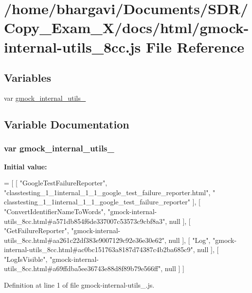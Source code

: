 \hypertarget{gmock-internal-utils__8cc_8js}{}\section{/home/bhargavi/\+Documents/\+S\+D\+R/\+Copy\+\_\+\+Exam\+\_\+X/docs/html/gmock-\/internal-\/utils\+\_\+8cc.js File Reference}
\label{gmock-internal-utils__8cc_8js}
\subsection*{Variables}
\begin{DoxyCompactItemize}
\item 
var \hyperlink{gmock-internal-utils__8cc_8js_ad7d96353508c193172e05b7d93122cf3}{gmock\+\_\+internal\+\_\+utils\+\_}
\end{DoxyCompactItemize}


\subsection{Variable Documentation}
\subsubsection[{\texorpdfstring{gmock\+\_\+internal\+\_\+utils\+\_\+8cc}{gmock_internal_utils_8cc}}]{\setlength{\rightskip}{0pt plus 5cm}var gmock\+\_\+internal\+\_\+utils\+\_}\hypertarget{gmock-internal-utils__8cc_8js_ad7d96353508c193172e05b7d93122cf3}{}\label{gmock-internal-utils__8cc_8js_ad7d96353508c193172e05b7d93122cf3}
{\bfseries Initial value\+:}
\begin{DoxyCode}
=
[
    [ \textcolor{stringliteral}{"GoogleTestFailureReporter"}, \textcolor{stringliteral}{"classtesting\_1\_1internal\_1\_1\_google\_test\_failure\_reporter.html"}, \textcolor{stringliteral}{"
      classtesting\_1\_1internal\_1\_1\_google\_test\_failure\_reporter"} ],
    [ \textcolor{stringliteral}{"ConvertIdentifierNameToWords"}, \textcolor{stringliteral}{"gmock-internal-utils\_8cc.html#a571db854f6de337007c53573c9cbf8a3"}, 
      null ],
    [ \textcolor{stringliteral}{"GetFailureReporter"}, \textcolor{stringliteral}{"gmock-internal-utils\_8cc.html#aa261c22df383e9007129c92e36e30e62"}, null ],
    [ \textcolor{stringliteral}{"Log"}, \textcolor{stringliteral}{"gmock-internal-utils\_8cc.html#ac0bc151763a8187d74387c4b2ba685c9"}, null ],
    [ \textcolor{stringliteral}{"LogIsVisible"}, \textcolor{stringliteral}{"gmock-internal-utils\_8cc.html#a69ffdba5ee36743e88d8f89b79e566ff"}, null ]
]
\end{DoxyCode}


Definition at line 1 of file gmock-\/internal-\/utils\+\_.\+js.

